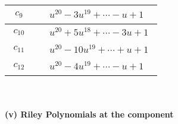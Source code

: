 \documentclass[1p]{elsarticle_modified}
\theoremstyle{definition}
\begin{document}
\begin{tabular}{m{50pt}|m{274pt}}
\hline $$\begin{aligned}c_{9}\end{aligned}$$&$\begin{aligned}
&u^{20}-3 u^{19}+\cdots- u+1
\end{aligned}$\\
\hline $$\begin{aligned}c_{10}\end{aligned}$$&$\begin{aligned}
&u^{20}+5 u^{18}+\cdots-3 u+1
\end{aligned}$\\
\hline $$\begin{aligned}c_{11}\end{aligned}$$&$\begin{aligned}
&u^{20}-10 u^{19}+\cdots+u+1
\end{aligned}$\\
\hline $$\begin{aligned}c_{12}\end{aligned}$$&$\begin{aligned}
&u^{20}-4 u^{19}+\cdots- u+1
\end{aligned}$\\
\hline
\end{tabular}\\~\\
\newpage\renewcommand{\arraystretch}{1}
\flushleft \textbf{(v) Riley Polynomials at the component}\newline \\
\end{document}
